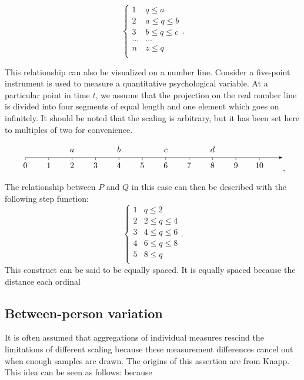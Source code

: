 \documentclass[utf8]{FrontiersinVancouver}
\begin{document}
\[
\begin{cases} 
    1 & q \leq a\\
    2 & a \leq q \leq b\\
    3 & b \leq q \leq c\\
    \ldots & \ldots\\    
    n & z\leq q\\
\end{cases}.
\]

This relationship can also be visualized on a number line. Consider a five-point instrument is used to measure a quantitative psychological variable. At a particular point in time $t$, we assume that the projection on the real number line is divided into four segments of equal length and one element which goes on infinitely. It should be noted that the scaling is arbitrary, but it has been set here to multiples of two for convenience. 

\[
\begin{tikzpicture}
    \draw[-latex] (0,0) -- (11,0);
    \foreach \x in {0,...,10}
        \draw (\x,0) -- (\x,-3pt);
    \foreach \x in {0,...,10}
        \node [below] at (\x,-0.1) {$\x$};
    \foreach \x\y in {2/a,4/b,6/c,8/d}
        \node [above] at (\x,0.1) {$\y$};
\end{tikzpicture},
\]

The relationship between $P$ and $Q$ in this case can then be described with the following step function:
\[
\begin{cases} 
    1 & q \leq 2\\
    2 & 2 \leq q \leq 4\\
    3 & 4 \leq q \leq 6\\
    4 & 6 \leq q \leq 8\\    
    5 & 8\leq q\\
\end{cases}.
\]
This construct can be said to be equally spaced. It is equally spaced because the distance each ordinal 
\subsection{Between-person variation}
It is often assumed that aggregations of individual measures rescind the limitations of different scaling because these measurement differences cancel out when enough samples are drawn. The origins of this assertion are from Knapp. This idea can be seen as follows: because 
\end{document}
